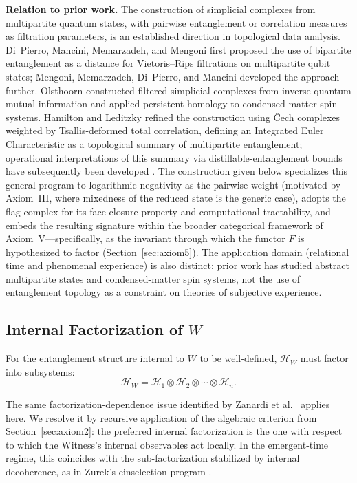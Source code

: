 \documentclass[12pt, a4paper]{article}
\begin{document}
\medskip
\noindent\textbf{Relation to prior work.} The construction of simplicial complexes from multipartite quantum states, with pairwise entanglement or correlation measures as filtration parameters, is an established direction in topological data analysis. Di~Pierro, Mancini, Memarzadeh, and Mengoni \cite{DiPierro2018} first proposed the use of bipartite entanglement as a distance for Vietoris--Rips filtrations on multipartite qubit states; Mengoni, Memarzadeh, Di~Pierro, and Mancini \cite{Mengoni2019} developed the approach further. Olsthoorn \cite{Olsthoorn2023} constructed filtered simplicial complexes from inverse quantum mutual information and applied persistent homology to condensed-matter spin systems. Hamilton and Leditzky \cite{HamiltonLeditzky2024} refined the construction using \v{C}ech complexes weighted by Tsallis-deformed total correlation, defining an Integrated Euler Characteristic as a topological summary of multipartite entanglement; operational interpretations of this summary via distillable-entanglement bounds have subsequently been developed \cite{Spellman2025}. The construction given below specializes this general program to logarithmic negativity as the pairwise weight (motivated by Axiom~III, where mixedness of the reduced state is the generic case), adopts the flag complex for its face-closure property and computational tractability, and embeds the resulting signature within the broader categorical framework of Axiom~V---specifically, as the invariant through which the functor $F$ is hypothesized to factor (Section~\ref{sec:axiom5}). The application domain (relational time and phenomenal experience) is also distinct: prior work has studied abstract multipartite states and condensed-matter spin systems, not the use of entanglement topology as a constraint on theories of subjective experience.

\subsection{Internal Factorization of $W$}

For the entanglement structure internal to $W$ to be well-defined, $\mathcal{H}_W$ must factor into subsystems:
\begin{equation}
\mathcal{H}_W = \mathcal{H}_1 \otimes \mathcal{H}_2 \otimes \cdots \otimes \mathcal{H}_n.
\label{eq:internal}
\end{equation}

The same factorization-dependence issue identified by Zanardi et al.\ \cite{Zanardi2004} applies here. We resolve it by recursive application of the algebraic criterion from Section~\ref{sec:axiom2}: the preferred internal factorization is the one with respect to which the Witness's internal observables act locally. In the emergent-time regime, this coincides with the sub-factorization stabilized by internal decoherence, as in Zurek's einselection program \cite{Zurek2009}.
\end{document}
